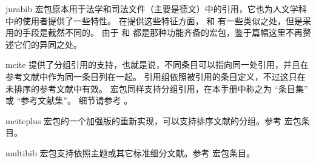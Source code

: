 \begin{marglist}
\item[jurabib]
 宏包原本用于法学和司法文件（主要是德文）中的引用，它也为人文学科中的使用者提供了一些特性。
在提供这些特征方面， 和 \biblatex 有一些类似之处，但是采用的手段是截然不同的。
由于  和 \biblatex 都是那种功能齐备的宏包，鉴于篇幅这里不再赘述它们的异同之处。

\item[mcite]
 提供了分组引用的支持，也就是说，不同条目可以指向同一处引用，并且在参考文献中作为同一条目列在一起。
引用组依照被引用的条目定义，不过这只在未排序的参考文献中有效。
\biblatex 宏包同样支持分组引用，在本手册中称之为 “条目集” 或 “参考文献集”。
细节请参考 。

\item[mciteplus]
 宏包的一个加强版的重新实现，可以支持排序文献的分组。参考  宏包条目。

\item[multibib]
 宏包支持依照主题或其它标准细分文献。参考  宏包条目。


\end{marglist}

